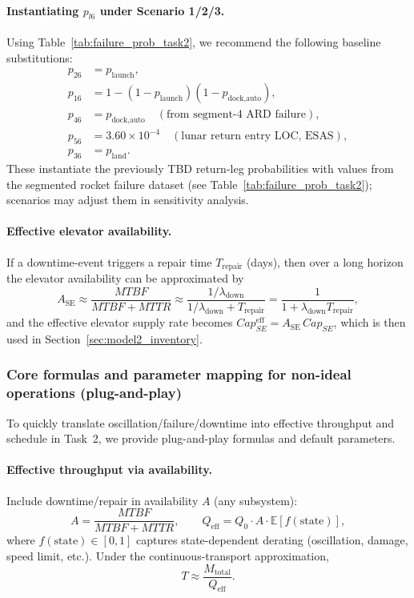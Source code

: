 ﻿\documentclass{mcmthesis}
\begin{document}
\paragraph{Instantiating $p_{l6}$ under Scenario 1/2/3.}
Using Table~\ref{tab:failure_prob_task2}, we recommend the following baseline substitutions:
\begin{align}
p_{26} &= p_{\text{launch}},\\
p_{16} &= 1-(1-p_{\text{launch}})(1-p_{\text{dock,auto}}),\\
p_{46} &= p_{\text{dock,auto}} \quad(\text{from segment-4 ARD failure}),\\
p_{56} &= 3.60\times 10^{-4}\quad(\text{lunar return entry LOC, ESAS}),\\
p_{36} &= p_{\text{land}}.
\end{align}
These instantiate the previously TBD return-leg probabilities with values from the segmented rocket failure dataset (see Table~\ref{tab:failure_prob_task2}); scenarios may adjust them in sensitivity analysis.

\paragraph{Effective elevator availability.}
If a downtime-event triggers a repair time $T_{\text{repair}}$ (days), then over a long horizon
the elevator availability can be approximated by
\begin{equation}
A_{\text{SE}} \approx \frac{MTBF}{MTBF+MTTR}
\approx \frac{1/\lambda_{\text{down}}}{1/\lambda_{\text{down}}+T_{\text{repair}}}
= \frac{1}{1+\lambda_{\text{down}}T_{\text{repair}}},
\end{equation}
and the effective elevator supply rate becomes
$Cap_{SE}^{\text{eff}}=A_{\text{SE}}\,Cap_{SE}$, which is then used in
Section~\ref{sec:model2_inventory}.

\subsubsection{Core formulas and parameter mapping for non-ideal operations (plug-and-play)}
\label{sec:model2_nonideal_mapping}

To quickly translate oscillation/failure/downtime into effective throughput and schedule in Task~2, we provide plug-and-play formulas and default parameters.

\paragraph{Effective throughput via availability.}
Include downtime/repair in availability $A$ (any subsystem):
\begin{equation}
A=\frac{MTBF}{MTBF+MTTR},\qquad
Q_{\text{eff}}=Q_0\cdot A\cdot \mathbb{E}[f(\text{state})],
\end{equation}
where $f(\text{state})\in[0,1]$ captures state-dependent derating (oscillation, damage, speed limit, etc.). Under the continuous-transport approximation,
\begin{equation}
T\approx \frac{M_{\text{total}}}{Q_{\text{eff}}}.
\end{equation}
\end{document}

